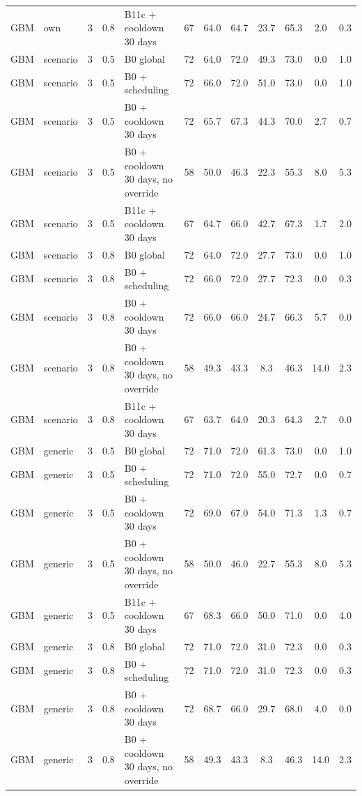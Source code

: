 \documentclass[10pt,onecolumn,letterpaper]{article}
\begin{document}
\begin{longtable}{lllllccccccc}
GBM & own & 3 & 0.8 & B11c + cooldown 30 days & 67 & 64.0 & 64.7 & 23.7 & 65.3 & 2.0 & 0.3 \\
GBM & scenario & 3 & 0.5 & B0 global & 72 & 64.0 & 72.0 & 49.3 & 73.0 & 0.0 & 1.0 \\
GBM & scenario & 3 & 0.5 & B0 + scheduling & 72 & 66.0 & 72.0 & 51.0 & 73.0 & 0.0 & 1.0 \\
GBM & scenario & 3 & 0.5 & B0 + cooldown 30 days & 72 & 65.7 & 67.3 & 44.3 & 70.0 & 2.7 & 0.7 \\
GBM & scenario & 3 & 0.5 & B0 + cooldown 30 days, no override & 58 & 50.0 & 46.3 & 22.3 & 55.3 & 8.0 & 5.3 \\
GBM & scenario & 3 & 0.5 & B11c + cooldown 30 days & 67 & 64.7 & 66.0 & 42.7 & 67.3 & 1.7 & 2.0 \\
GBM & scenario & 3 & 0.8 & B0 global & 72 & 64.0 & 72.0 & 27.7 & 73.0 & 0.0 & 1.0 \\
GBM & scenario & 3 & 0.8 & B0 + scheduling & 72 & 66.0 & 72.0 & 27.7 & 72.3 & 0.0 & 0.3 \\
GBM & scenario & 3 & 0.8 & B0 + cooldown 30 days & 72 & 66.0 & 66.0 & 24.7 & 66.3 & 5.7 & 0.0 \\
GBM & scenario & 3 & 0.8 & B0 + cooldown 30 days, no override & 58 & 49.3 & 43.3 & 8.3 & 46.3 & 14.0 & 2.3 \\
GBM & scenario & 3 & 0.8 & B11c + cooldown 30 days & 67 & 63.7 & 64.0 & 20.3 & 64.3 & 2.7 & 0.0 \\
GBM & generic & 3 & 0.5 & B0 global & 72 & 71.0 & 72.0 & 61.3 & 73.0 & 0.0 & 1.0 \\
GBM & generic & 3 & 0.5 & B0 + scheduling & 72 & 71.0 & 72.0 & 55.0 & 72.7 & 0.0 & 0.7 \\
GBM & generic & 3 & 0.5 & B0 + cooldown 30 days & 72 & 69.0 & 67.0 & 54.0 & 71.3 & 1.3 & 0.7 \\
GBM & generic & 3 & 0.5 & B0 + cooldown 30 days, no override & 58 & 50.0 & 46.0 & 22.7 & 55.3 & 8.0 & 5.3 \\
GBM & generic & 3 & 0.5 & B11c + cooldown 30 days & 67 & 68.3 & 66.0 & 50.0 & 71.0 & 0.0 & 4.0 \\
GBM & generic & 3 & 0.8 & B0 global & 72 & 71.0 & 72.0 & 31.0 & 72.3 & 0.0 & 0.3 \\
GBM & generic & 3 & 0.8 & B0 + scheduling & 72 & 71.0 & 72.0 & 31.0 & 72.3 & 0.0 & 0.3 \\
GBM & generic & 3 & 0.8 & B0 + cooldown 30 days & 72 & 68.7 & 66.0 & 29.7 & 68.0 & 4.0 & 0.0 \\
GBM & generic & 3 & 0.8 & B0 + cooldown 30 days, no override & 58 & 49.3 & 43.3 & 8.3 & 46.3 & 14.0 & 2.3 \\

\end{longtable}
\end{document}
